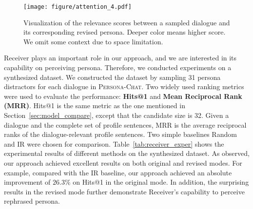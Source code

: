 \documentclass[11pt,a4paper]{article}
\begin{document}
\begin{table}[t]
    \centering
    \caption{Experimental results on Persona Perception.}
    \label{tab:receiver_exper}
\end{table}

\begin{figure}[t]
    \centering
    \texttt{[image: figure/attention\_4.pdf]}
    \caption{Visualization of the relevance scores between a sampled dialogue and its corresponding revised persona. Deeper color means higher score. We omit some context due to space limitation.}
    \label{fig:receiver_heatmap}
\end{figure}

Receiver plays an important role in our approach, and we are interested in its capability on perceiving persona. Therefore, we conducted experiments on a synthesized dataset. 
We constructed the dataset by sampling 31 persona distractors for each dialogue in \textsc{Persona-Chat}. Two widely used ranking metrics were used to evaluate the performance: \textbf{Hits@1} and \textbf{Mean Reciprocal Rank (MRR)}. Hits@1 is the same metric as the one mentioned in Section~\ref{sec:model_compare}, except that the candidate size is 32. 
Given a dialogue and the complete set of profile sentences, MRR is the average reciprocal ranks of the dialogue-relevant profile sentences. Two simple baselines Random and IR \cite{sordonineural2015} were chosen for comparison. Table~\ref{tab:receiver_exper} shows the experimental results of different methods on the synthesized dataset. As observed, our approach achieved excellent results on both original and revised modes. For example, compared with the IR baseline, our approach achieved an absolute improvement of $26.3\%$ on Hits@1 in the original mode. In addition, the surprising results in the revised mode further demonstrate Receiver's capability to perceive rephrased persona.
\end{document}
